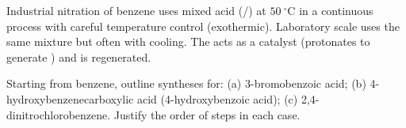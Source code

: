 \documentclass[11pt]{article}
\begin{document}
\begin{savaistu}
Industrial nitration of benzene uses mixed acid (/) at $\SI{50}{\ensuremath{{}^{\circ}\mathrm{C}}}$ in a continuous process with careful temperature control (exothermic). Laboratory scale uses the same mixture but often with cooling. The  acts as a catalyst (protonates  to generate ) and is regenerated.
\end{savaistu}

\begin{exercice}
Starting from benzene, outline syntheses for: (a) 3-bromobenzoic acid; (b) 4-hydroxybenzenecarboxylic acid (4-hydroxybenzoic acid); (c) 2,4-dinitrochlorobenzene. Justify the order of steps in each case.
\end{exercice}
\end{document}
